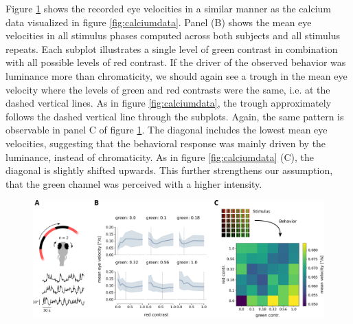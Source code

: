 Figure \ref{fig:behavdata} shows the recorded eye velocities in a similar manner as the calcium data visualized in figure \ref{fig:calciumdata}. Panel (B) shows the mean eye velocities in all stimulus phases computed across both subjects and all stimulus repeats. Each subplot illustrates a single level of green contrast in combination with all possible levels of red contrast. If the driver of the observed behavior was luminance more than chromaticity, we should again see a trough in the mean eye velocity where the levels of green and red contrasts were the same, i.e. at the dashed vertical lines. As in figure \ref{fig:calciumdata}, the trough approximately follows the dashed vertical line through the subplots. Again, the same pattern is observable in panel C of figure \ref{fig:behavdata}. The diagonal includes the lowest mean eye velocities, suggesting that the behavioral response was mainly driven by the luminance, instead of chromaticity. As in figure \ref{fig:calciumdata} (C), the diagonal is slightly shifted upwards. This further strengthens our assumption, that the green channel was perceived with a higher intensity. 

\begin{figure}[H]
    \centering
    \includegraphics[width=\linewidth]{figures/contrast_curves_behav_test.pdf}
    \label{fig:behavdata}
\end{figure}